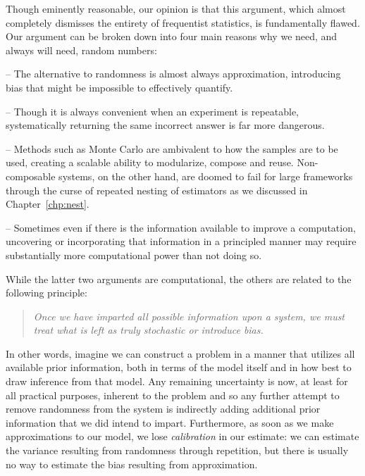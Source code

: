 Though eminently reasonable, our opinion is that this argument, which almost completely dismisses the entirety
of frequentist statistics, is fundamentally flawed.  Our argument can be broken down into four main reasons 
why we need, and always will need, random numbers:
\begin{description}[align=left]
	\vspace{-8pt}
	\setlength\itemsep{-0.1em}
	\item[Honesty and reliability] -- The alternative to randomness is almost always approximation, introducing bias 
	that might be impossible to effectively quantify.
	\item[Lack of repeatability] -- Though it is always convenient when an experiment is repeatable, systematically 
	returning the same incorrect answer is far more dangerous.
	\item[Composability] -- Methods such as Monte Carlo are ambivalent to how the samples are to be used, creating 
	a scalable ability to modularize, compose and reuse.  Non-composable systems, on the other hand, are doomed to fail
	for large frameworks through the curse of repeated nesting of estimators as we discussed in Chapter~\ref{chp:nest}.
	\item[Speed and simplicity] -- Sometimes even if there is the information available to improve a computation, 
	uncovering or incorporating that information in a principled manner may require substantially more computational 
	power than not doing so.
	\vspace{-10pt}
\end{description}
While the latter two arguments are computational, the others are related to the following principle:
\begin{quote}
	\vspace{-4pt}
	\emph{Once we have imparted all possible information upon a system, we must treat what is left as truly 
		stochastic or introduce bias.}
	\vspace{-8pt}
\end{quote}
In other words, imagine we can construct a problem in a manner that utilizes all available prior information,
both in terms of the model itself and in how best to draw inference from that model.
Any remaining uncertainty is now, at least for all practical purposes, inherent to the problem and so any
further attempt to remove randomness from the system is indirectly adding additional prior information  that we
did intend to impart.  Furthermore, as soon as we make approximations to our model,
we lose \emph{calibration} in our estimate: we can estimate the variance
resulting from randomness through repetition, but there is usually no way to estimate the bias
resulting from approximation.

